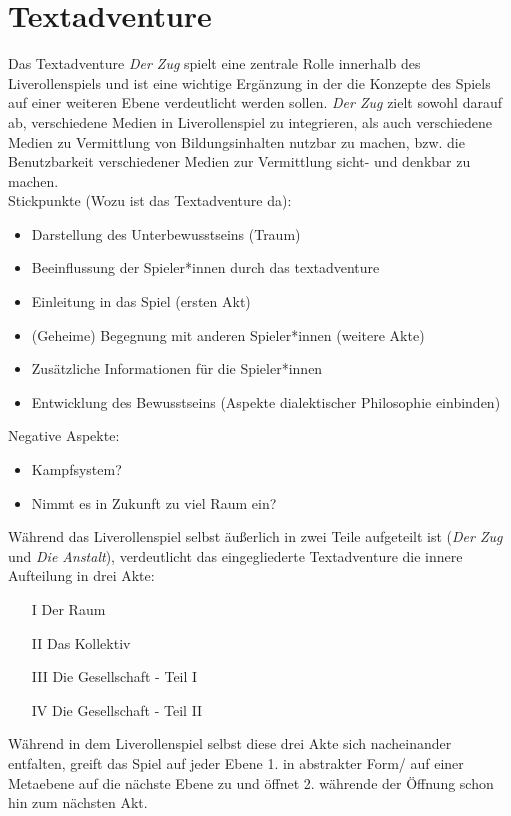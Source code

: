 \documentclass[a4paper, 12pt]{scrartcl}
\begin{document}
    \section{Textadventure} \label{textadventure} 
    Das Textadventure \textit{Der Zug} spielt eine zentrale Rolle innerhalb des Liverollenspiels und ist eine wichtige Ergänzung in der die Konzepte des Spiels auf einer weiteren Ebene verdeutlicht werden sollen. 
    \textit{Der Zug} zielt sowohl darauf ab, verschiedene Medien in Liverollenspiel zu integrieren, als auch verschiedene Medien zu Vermittlung von Bildungsinhalten nutzbar zu machen, bzw. die Benutzbarkeit verschiedener Medien zur Vermittlung sicht- und denkbar zu machen.\\
    Stickpunkte (Wozu ist das Textadventure da):
    \begin{itemize}
    \item Darstellung des Unterbewusstseins (Traum)
    \item Beeinflussung der Spieler*innen durch das textadventure
    \item Einleitung in das Spiel (ersten Akt)
    \item (Geheime) Begegnung mit anderen Spieler*innen (weitere Akte)
    \item Zusätzliche Informationen für die Spieler*innen
    \item Entwicklung des Bewusstseins (Aspekte dialektischer Philosophie einbinden)
    \end{itemize}
    Negative Aspekte:
    \begin{itemize}
    \item Kampfsystem?
    \item Nimmt es in Zukunft zu viel Raum ein? 
    \end{itemize}
    Während das Liverollenspiel selbst äußerlich in zwei Teile aufgeteilt ist (\textit{Der Zug} und \textit{Die Anstalt}), verdeutlicht das eingegliederte Textadventure die innere Aufteilung in drei Akte: 
    \begin{itemize}
    \item[I] Der Raum
    \item[II] Das Kollektiv 
    \item[III] Die Gesellschaft - Teil I
    \item[IV] Die Gesellschaft - Teil II
    \end{itemize}
    Während in dem Liverollenspiel selbst diese drei Akte sich nacheinander entfalten, greift das Spiel auf jeder Ebene 1. in abstrakter Form/ auf einer Metaebene auf die nächste Ebene zu und öffnet 2. währende der Öffnung schon hin zum nächsten Akt. \\
\end{document}
